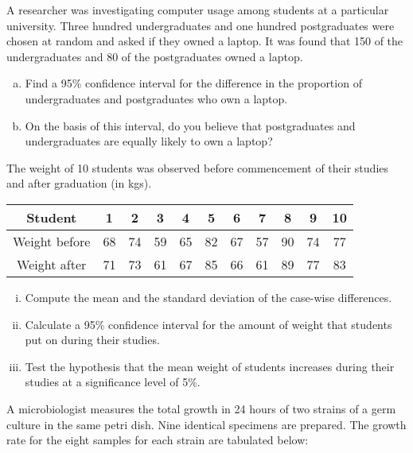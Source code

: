 
A researcher was investigating computer usage among students at a particular university. 
Three hundred undergraduates and one hundred postgraduates were chosen at random and asked if they owned a laptop. 
It was found that 150 of the undergraduates and 80 of the postgraduates owned a laptop. 
\begin{enumerate}[(a)]
\item Find a 95\% confidence interval for the difference in the proportion of undergraduates and postgraduates who own a laptop. 
\item On the basis of this interval, do you believe that postgraduates and undergraduates are equally likely to own a laptop? 
\end{enumerate}


\item 

The weight of 10 students was observed before commencement of their studies and after graduation (in kgs).

\begin{center}
\begin{tabular}{|c||c|c|c|c|c|c|c|c|c|c|} \hline 
Student &1&2&3&4&5&6&7&8&9&10\\ \hline 
Weight before &68& 74& 59& 65& 82&67&57&90&74&77\\ \hline 
Weight after&71&73&61&67&85&66&61&89&77&83\\ \hline 
\end{tabular}
\end{center}


\begin{enumerate}[(i)]
\item Compute the mean and the standard deviation of the case-wise differences.
\item  Calculate a 95\% confidence interval for the amount of weight that students put on during their studies. 
\item   Test the hypothesis that the mean weight of students increases during their studies at a significance level of  5\%. 
\end{enumerate}


\item A microbiologist measures the total growth in 24 hours of two strains of a germ culture  in the same petri dish. Nine identical specimens are prepared. The growth rate for the eight samples for each strain are tabulated below:

